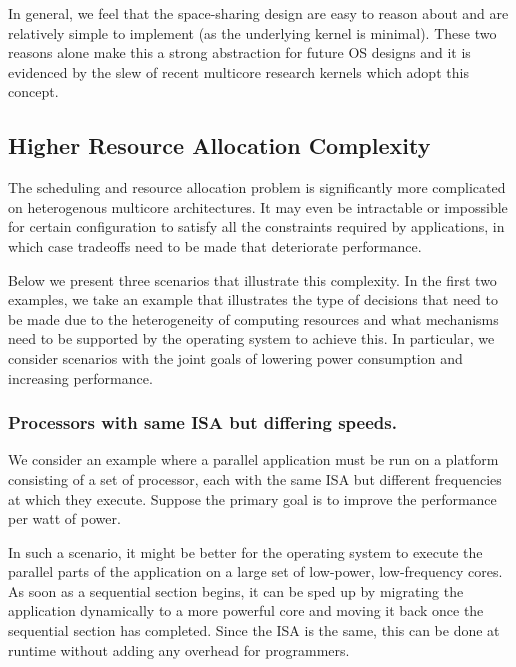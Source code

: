 In general, we feel that the space-sharing design are easy to reason about and are relatively simple to implement (as the underlying kernel is minimal). These two reasons alone make this a strong abstraction for future OS designs and it is evidenced by the slew of recent multicore research kernels which adopt this concept.

\subsection{Higher Resource Allocation Complexity}

The scheduling and resource allocation problem is significantly more complicated on heterogenous multicore architectures. It may even be intractable or impossible for certain configuration to satisfy all the constraints required by applications, in which case tradeoffs need to be made that deteriorate performance.


Below we present three scenarios that illustrate this complexity. In the first two examples, we take an example that illustrates the type of decisions that need to be made due to the heterogeneity of computing resources and what mechanisms need to be supported by the operating system to achieve this. In particular, we consider scenarios with the joint goals of lowering power consumption and increasing performance.

\subsubsection{Processors with same ISA but differing speeds.}
We consider an example where a parallel application must be run on a platform consisting of a set of processor, each with the same ISA but different frequencies at which they execute. Suppose the primary goal is to improve the performance per watt of power.

In such a scenario, it might be better for the operating system to execute the parallel parts of the application on a large set of low-power, low-frequency cores. As soon as a sequential section begins, it can be sped up by migrating the application dynamically to a more powerful core and moving it back once the sequential section has completed. Since the ISA is the same, this can be done at runtime without adding any overhead for programmers.

